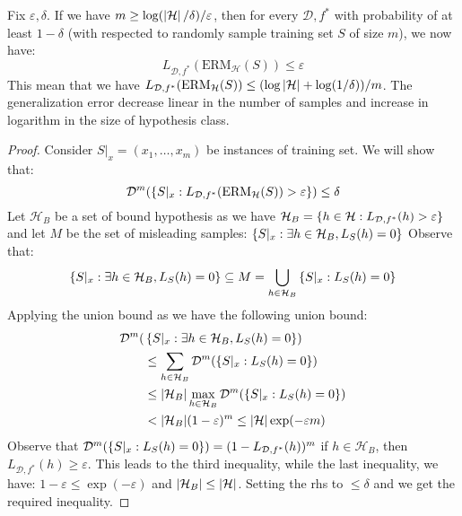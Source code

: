 \begin{theorem}
    Fix $\varepsilon, \delta$. If we have $m\ge\log(\left| \mathcal{H} \right|/\delta)/\varepsilon$, then for every $\mathcal{D}, f^*$ with probability of at least $1-\delta$ (with respected to randomly sample training set $S$ of size $m$), we now have:
    \begin{equation*}
        L_{\mathcal{D}, f^*} (\text{ERM}_\mathcal{H}(S)) \le \varepsilon
    \end{equation*}
    This mean that we have $L_{\mathcal{D}, f^*} (\text{ERM}_\mathcal{H}(S)) \le (\log\left| \mathcal{H} \right| + \log(1/\delta))/m$. The generalization error decrease linear in the number of samples and increase in logarithm in the size of hypothesis class.
\end{theorem}
\begin{proof}
    Consider $S|_{x} = (x_1,\dots,x_m)$ be instances of training set. We will show that:
    \begin{equation*}
        \mathcal{D}^m(\left\{ S|_x : L_{\mathcal{D}, f^*} (\text{ERM}_\mathcal{H}(S)) > \varepsilon \right\}) \le \delta
    \end{equation*}
    Let $\mathcal{H}_B$ be a set of bound hypothesis as we have $\mathcal{H}_B = \left\{ h \in \mathcal{H} : L_{\mathcal{D}, f^*}(h)>\varepsilon \right\}$ and let $M$ be the set of misleading samples: $\left\{ S|_x : \exists h \in \mathcal{H}_B, L_S(h) = 0 \right\}$ Observe that:
    \begin{equation*}
        \left\{ S|_x : \exists h \in \mathcal{H}_B, L_S(h) = 0 \right\} \subseteq M = \bigcup_{h\in\mathcal{H}_B }\left\{ S|_x : L_S(h) = 0 \right\}
    \end{equation*}
    Applying the union bound as we have the following union bound:
    \begin{equation*}
    \begin{aligned}
        \mathcal{D}^m(&\brackc{S|_x : \exists h \in \mathcal{H}_B, L_S(h) = 0}) \\
        &\le\sum_{h\in\mathcal{H}_B} \mathcal{D}^m(\brackc{S|_x : L_S(h) = 0} ) \\
        &\le |\mathcal{H}_B|\max_{h\in\mathcal{H}_B}\mathcal{D}^m(\brackc{S|_x : L_S(h) = 0}) \\
        &<|\mathcal{H}_B|(1-\varepsilon)^m \le \abs{\mathcal{H}}\exp(-\varepsilon m)
    \end{aligned}
    \end{equation*}
    Observe that $\mathcal{D}^m(\left\{ S|_x : L_S(h) = 0 \right\}) = (1-L_{\mathcal{D}, f^*}(h))^m$ if $h \in \mathcal{H}_B$, then $L_{\mathcal{D}, f^*}(h)\ge\varepsilon$. This leads to the third inequality, while the last inequality, we have: $1-\varepsilon \le\exp(-\varepsilon)$ and $|\mathcal{H}_B|\le\left| \mathcal{H} \right|$. Setting the rhs to $\le\delta$ and we get the required inequality.
\end{proof}

